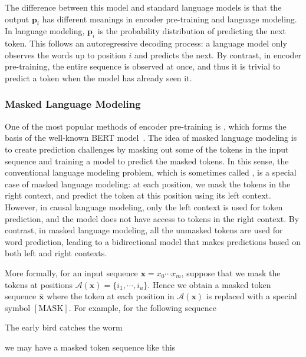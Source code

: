 The difference between this model and standard language models is that the output $\mathbf{p}_i$ has different meanings in encoder pre-training and language modeling. In language modeling, $\mathbf{p}_i$ is the probability distribution of predicting the next token. This follows an autoregressive decoding process: a language model only observes the words up to position $i$ and predicts the next. By contrast, in encoder pre-training, the entire sequence is observed at once, and thus it is trivial to predict a token when the model has already seen it.

\subsubsection{Masked Language Modeling}

\noindent One of the most popular methods of encoder pre-training is , which forms the basis of the well-known BERT model~\cite{devlin-etal:2019bert}. The idea of masked language modeling is to create prediction challenges by masking out some of the tokens in the input sequence and training a model to predict the masked tokens. In this sense, the conventional language modeling problem, which is sometimes called , is a special case of masked language modeling: at each position, we mask the tokens in the right context, and predict the token at this position using its left context. However, in causal language modeling, only the left context is used for token prediction, and the model does not have access to tokens in the right context. By contrast, in masked language modeling, all the unmasked tokens are used for word prediction, leading to a bidirectional model that makes predictions based on both left and right contexts.

More formally, for an input sequence $\mathbf{x}=x_0\cdots x_m$, suppose that we mask the tokens at positions $\mathcal{A}(\mathbf{x}) = \{i_1,\cdots,i_{u}\}$. Hence we obtain a masked token sequence $\bar{\mathbf{x}}$ where the token at each position in $\mathcal{A}(\mathbf{x})$ is replaced with a special symbol $[\mathrm{MASK}]$. For example, for the following sequence

\vspace{0.5em}
\begin{center}
The early bird catches the worm
\end{center}
\vspace{0.5em}

\noindent we may have a masked token sequence like this


